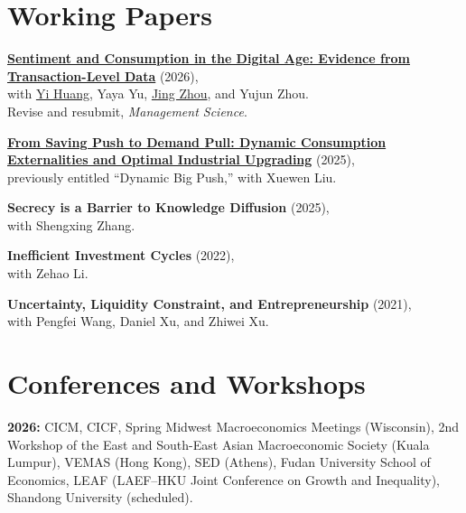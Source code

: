 \documentclass[11pt]{res}
\newcommand{\paper}[3]{\textbf{\href{#1}{#2}} (#3)}
\newcommand{\yearskip}{\par\vspace{0.08in}}
\newenvironment{cvitem}
  {\par\noindent\hspace{-0.42in}\begin{minipage}{\linewidth}}
  {\end{minipage}\par\vspace{0.08in}}
\begin{document}
\begin{resume}
\section{\bf Working Papers}
\vspace{0.15in}

\begin{cvitem}
\paper{https://papers.ssrn.com/sol3/papers.cfm?abstract_id=7259258}
  {Sentiment and Consumption in the Digital Age:
  Evidence from Transaction-Level Data}{2026},\\
with \href{https://yihuang05.wixsite.com/macro}{Yi Huang}, Yaya Yu,
\href{https://jing-zhou.weebly.com/}{Jing Zhou}, and Yujun Zhou.\\
Revise and resubmit, \textit{Management Science}.
\end{cvitem}

\begin{cvitem}
\paper{https://papers.ssrn.com/sol3/papers.cfm?abstract_id=5601090}
  {From Saving Push to Demand Pull:
  Dynamic Consumption Externalities and Optimal Industrial Upgrading}{2025},\\
previously entitled ``Dynamic Big Push,'' with Xuewen Liu.
\end{cvitem}

\begin{cvitem}
\textbf{Secrecy is a Barrier to Knowledge Diffusion} (2025),\\
with Shengxing Zhang.
\end{cvitem}

\begin{cvitem}
\textbf{Inefficient Investment Cycles} (2022),\\
with Zehao Li.
\end{cvitem}

\begin{cvitem}
\textbf{Uncertainty, Liquidity Constraint, and Entrepreneurship} (2021),\\
with Pengfei Wang, Daniel Xu, and Zhiwei Xu.
\end{cvitem}

\section{\bf Conferences and Workshops}
\vspace{0.1in}

\hspace{-0.42in}\begin{minipage}{\linewidth}
\textbf{2026:} CICM, CICF, Spring Midwest Macroeconomics Meetings
(Wisconsin), 2nd Workshop of the East and South-East Asian Macroeconomic
Society (Kuala Lumpur), VEMAS (Hong Kong), SED (Athens),
Fudan University School of Economics,
LEAF (LAEF--HKU Joint Conference on Growth and Inequality),
Shandong University (scheduled).
\yearskip


\end{minipage}
\end{resume}
\end{document}
